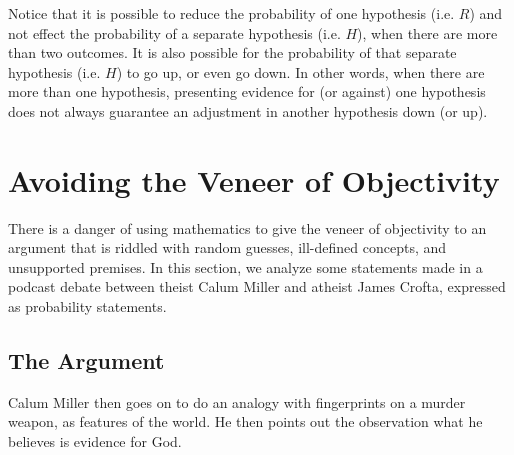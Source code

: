 \documentclass{tufte-book}
\begin{document}
Notice that it is possible to reduce the probability of one hypothesis
(i.e. \(R\)) and not effect the probability of a separate hypothesis
(i.e. \(H\)), when there are more than two outcomes. It is also possible
for the probability of that separate hypothesis (i.e. \(H\)) to go up,
or even go down. In other words, when there are more than one
hypothesis, presenting evidence for (or against) one hypothesis does not
always guarantee an adjustment in another hypothesis down (or up).

\section{Avoiding the Veneer of
Objectivity}\label{avoiding-the-veneer-of-objectivity}

There is a danger of using mathematics to give the veneer of objectivity
to an argument that is riddled with random guesses, ill-defined
concepts, and unsupported premises. In this section, we analyze some
statements made in a podcast debate between theist Calum Miller and
atheist James Crofta, expressed as probability
statements\citep{Brierley:2014ab}.

\subsection{The Argument}\label{the-argument}


Calum Miller then goes on to do an analogy with fingerprints on a
murder weapon, as features of the world. He then points
out the observation what he believes is evidence for God.

 
\end{document}
